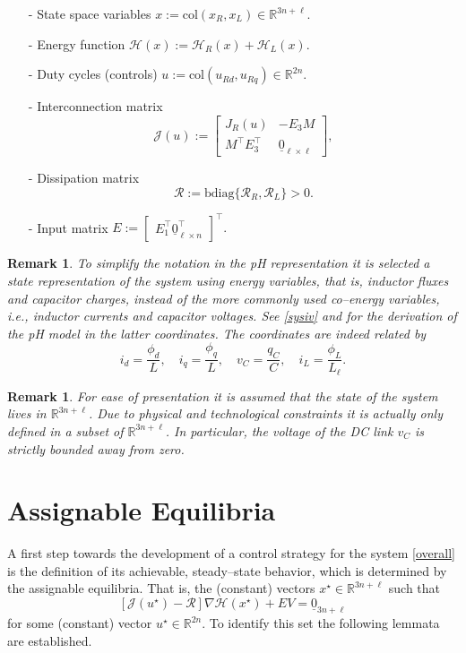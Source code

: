 \documentclass[5p,twocolumn]{elsarticle}
\def\rea{\mathbb{R}}
\def\col{\mbox{col}}
\def\begequ{\begin{equation}}
\def\endequ{\end{equation}}
\def\lab{\label}
\def\begrem{\begin{remark}\rm}
\def\endrem{\end{remark}}
\newtheorem{remark}[theorem]{Remark}
\numberwithin{equation}{section}
\begin{document}
\begin{itemize}
\item[-] State space variables $x:=\col(x_R,x_L) \in\mathbb{R}^{3n+\ell}$.

\item[-] Energy function $\mathcal H(x):=\mathcal{H}_R(x)+\mathcal{H}_L(x)$.

\item[-] Duty cycles (controls) $u:=\col(u_{Rd},u_{Rq}) \in\mathbb{R}^{2n}$.

\item[-] Interconnection matrix
\begin{equation}\label{Joverall}
\mathcal{J}(u):=\begin{bmatrix}J_{R}(u) & -E_3M \\ M ^\top E_3^\top&\underline{0}_{\ell\times
\ell}\end{bmatrix}, 
\end{equation}

\item[-] Dissipation matrix
\begequ
\lab{dismat}
\mathcal{R}:=\mathrm{bdiag}\{\mathcal{R}_{R},\mathcal{R}_{L}\}>0.
\endequ
\item[-] Input matrix $E:= \begin{bmatrix}
E_1^\top \underline{0}_{\ell\times n}^\top
\end{bmatrix}^\top.$
\end{itemize}


\begrem
To simplify the notation in the pH representation it is selected a state representation of the system using energy variables, that is, inductor fluxes and capacitor charges, instead of the more commonly used
co--energy variables, {\em i.e.}, inductor currents and capacitor voltages. See \eqref{sysiv} and \cite{perez} for the derivation of the pH model in the latter coordinates. The coordinates are indeed related by
\begin{equation}\label{coenergy}
i_d=\frac{\phi_d}{L},\quad i_q=\frac{\phi_q}{L},\quad v_C=\frac{q_C}{C},\quad i_L=\frac{\phi_L}{L_\ell}.
\end{equation}
\endrem

\begrem
For ease of presentation it is assumed that the state of the system lives in $\mathbb{R}^{3n+\ell}$. Due to physical and technological constraints it is actually only defined in a subset of
$\mathbb{R}^{3n+\ell}$. In particular, the voltage of the DC link $v_C$ is strictly bounded away from zero.
\endrem
\section{Assignable Equilibria}
\label{sssection}
A first step towards the development of a control strategy for the system \eqref{overall} is the definition of its achievable, steady--state behavior, which is determined by the assignable
equilibria. That is, the (constant) vectors $x^\star \in\mathbb{R}^{3n+\ell}$ such that
$$
[\mathcal{J}(u^\star )-\mathcal{R}]\nabla\mathcal H(x^\star )+EV=\underline{0}_{3n+\ell}
$$
for some (constant) vector $u^\star \in \rea^{2n}$. To identify this set the following lemmata are established.
\end{document}
